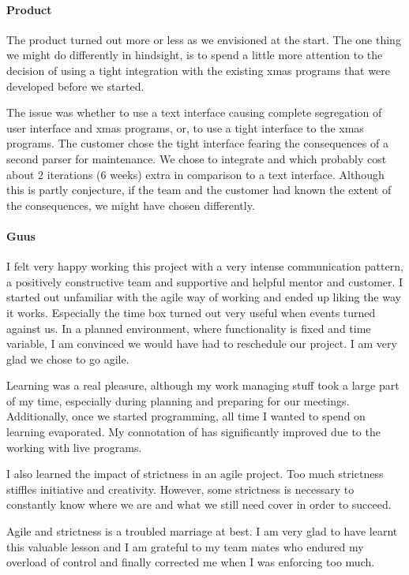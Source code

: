 \paragraph{Product} The product turned out more or less as we envisioned at the start. The one
thing we might do differently in hindsight, is to spend a little more attention to the decision
of using a tight integration with the existing xmas programs that were developed before we started.

The issue was whether to use a text interface causing complete segregation of user interface and
xmas programs, or, to use a tight interface to the xmas programs. The customer chose the tight 
interface fearing the consequences of a second parser for maintenance. We chose to integrate
\qml and \cpp which probably cost about 2 iterations (6 weeks) extra in comparison to a text
interface. Although this is partly conjecture, if the team and the customer had known the extent 
of the consequences, we might have chosen differently.

\paragraph{Guus} I felt very happy working this project with a very intense communication pattern,
a positively constructive team and supportive and helpful mentor and customer. I started out 
unfamiliar with the agile way of working and ended up liking the way it works. 
Especially the time box turned out very useful when events 
turned against us. In a planned environment, where functionality is fixed and time variable, I 
am convinced we would have had to reschedule our project. I am very glad we chose to go agile.

Learning \cpp was a real pleasure, although my work managing stuff took a large part of my time,
especially during planning and preparing for our meetings. Additionally, once we started programming,
all time I wanted to spend on learning \cpp evaporated. My connotation of \cpp has significantly improved
due to the working with live \cpp programs.

I also learned the impact of strictness in an agile project. Too much strictness stiffles initiative 
and creativity. However, some strictness is necessary to constantly know where we are and what we 
still need cover in order to succeed.

Agile and strictness is a troubled marriage at best. I am very glad to have learnt this valuable lesson and
I am grateful to my team mates who endured my overload of control and finally corrected me when I was 
enforcing too much.

